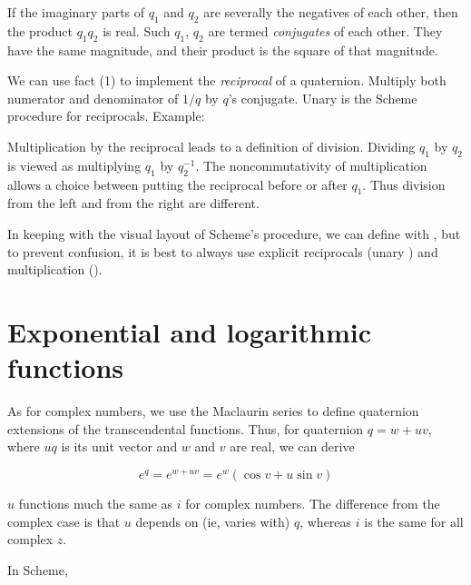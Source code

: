 \n If the imaginary parts of $q_1$ and $q_2$ are
severally the negatives of each other, then the
product $q_1 q_2$ is real.  Such $q_1$, $q_2$ are
termed {\em conjugates} of each other.  They have the
same magnitude, and their product is the square of that
magnitude.


\n We can use fact (1) to implement the {\em reciprocal} of a
quaternion.  Multiply both numerator and 
denominator of $1/q$  by $q$'s conjugate.  Unary \q{/}
is the Scheme procedure for reciprocals.  Example:


Multiplication by the reciprocal leads to a definition
of division.  Dividing $q_1$ by $q_2$ is viewed as
multiplying $q_1$ by $q_2^{-1}$.
The noncommutativity of
multiplication allows a choice between putting the
reciprocal before or after $q_1$.  Thus division from
the left and from the right are different.  

In keeping with the visual layout of Scheme's \q{/}
procedure, we can define 
 with 
, but to prevent confusion,
it is best to always use
explicit reciprocals (unary ) and multiplication
().

\section{Exponential and logarithmic functions}

As for complex numbers, we use the Maclaurin series to
define quaternion extensions of the transcendental
functions.
Thus, for quaternion $q = w + uv$, where $uq$ is its unit
vector and $w$ and $v$ are real, we can derive

$$
e^q = e^{w + u v} =  e^w(\cos v + u \sin v)
$$

\n $u$ functions much the same as $i$ for complex numbers.
The difference from the complex case is that 
$u$ depends on (ie, varies with) $q$, whereas $i$ is the same for all
complex $z$.

In Scheme,


